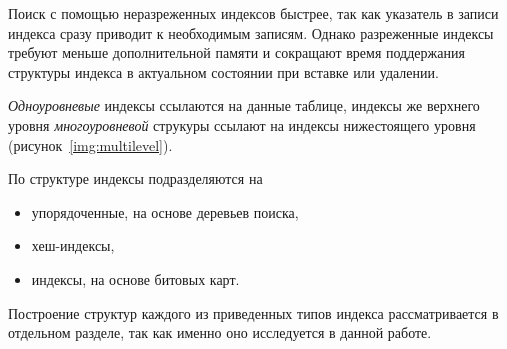 
Поиск с помощью неразреженных индексов быстрее, так как указатель в записи
индекса сразу приводит к необходимым записям. Однако разреженные индексы требуют
меньше дополнительной памяти и сокращают время поддержания структуры индекса в
актуальном состоянии при вставке или удалении.

\textit{Одноуровневые} индексы ссылаются на данные таблице, индексы же верхнего уровня
\textit{многоуровневой} струкуры ссылают на индексы нижестоящего уровня
(рисунок~\ref{img:multilevel}).


По структуре индексы подразделяются на
\begin{itemize}
    \item упорядоченные, на основе деревьев поиска,
    \item хеш-индексы,
    \item индексы, на основе битовых карт.
\end{itemize}

Построение структур каждого из приведенных типов индекса рассматривается в
отдельном разделе, так как именно оно исследуется в данной работе.

